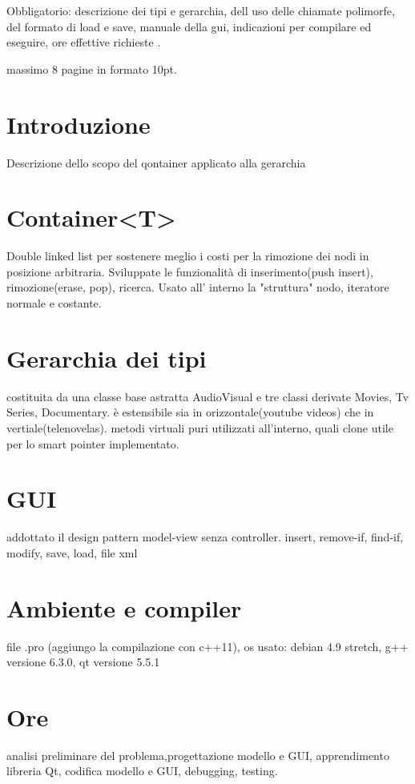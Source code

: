 


Obbligatorio: descrizione dei tipi e gerarchia, dell uso delle chiamate polimorfe, del formato di load e save, manuale della gui, indicazioni per compilare ed eseguire, ore effettive richieste .

massimo 8 pagine in formato 10pt.
    \section{Introduzione}
    Descrizione dello scopo del qontainer applicato alla gerarchia

    \section{Container<T>}
    Double linked list per sostenere meglio i costi per la rimozione dei nodi in posizione arbitraria. Sviluppate le funzionalità di inserimento(push insert), rimozione(erase, pop), ricerca. Usato all' interno la "struttura" nodo, iteratore normale e costante. 

    \section{Gerarchia dei tipi}
    costituita da una classe base astratta AudioVisual e tre classi derivate Movies, Tv Series, Documentary. è estensibile sia in orizzontale(youtube videos) che in vertiale(telenovelas). metodi virtuali puri utilizzati all'interno, quali clone utile per lo smart pointer implementato. 

    \section{GUI}
    addottato il design pattern model-view senza controller. 
    insert, remove-if, find-if, modify, save, load, file xml

    \section{Ambiente e compiler}
    file .pro (aggiungo la compilazione con c++11), os usato: debian 4.9 stretch, g++ versione 6.3.0, qt versione 5.5.1

    \section{Ore}
    analisi preliminare del problema,progettazione
    modello e GUI, apprendimento libreria Qt, codifica modello e GUI, debugging, testing.

